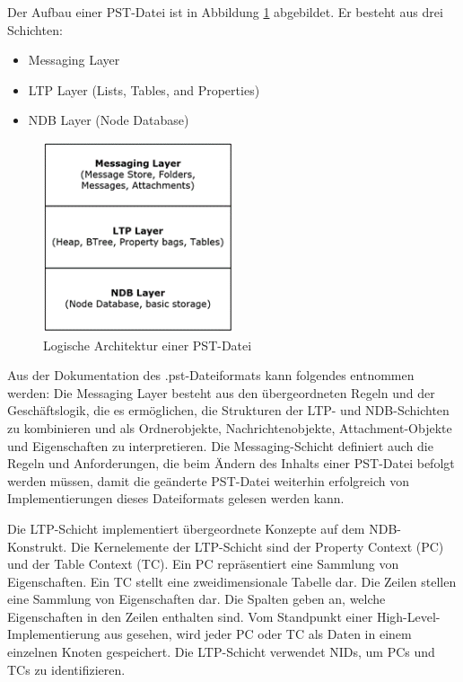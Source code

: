 \noindent Der Aufbau einer PST-Datei ist in Abbildung \ref{fig:pstarchitecture} abgebildet. Er besteht aus drei Schichten:

\begin{itemize}
    \item Messaging Layer
    \item LTP Layer (Lists, Tables, and Properties)
    \item NDB Layer (Node Database)
\end{itemize}

\begin{figure}[!ht]
    \centering
    \includegraphics[width=0.50\textwidth]{images/PST_File.png}
    \caption{Logische Architektur einer PST-Datei \cite{.c}} 
    \label{fig:pstarchitecture}
\end{figure}

\noindent Aus der Dokumentation \cite{.c} des .pst-Dateiformats kann folgendes entnommen werden: \newline
Die Messaging Layer besteht aus den übergeordneten Regeln und der Geschäftslogik, die es ermöglichen, die Strukturen der LTP- und NDB-Schichten zu kombinieren und als Ordnerobjekte, Nachrichtenobjekte, Attachment-Objekte und Eigenschaften zu interpretieren. Die Messaging-Schicht definiert auch die Regeln und Anforderungen, die beim Ändern des Inhalts einer PST-Datei befolgt werden müssen, damit die geänderte PST-Datei weiterhin erfolgreich von Implementierungen dieses Dateiformats gelesen werden kann. \smallskip


\noindent Die LTP-Schicht implementiert übergeordnete Konzepte auf dem NDB-Konstrukt. Die Kernelemente der LTP-Schicht sind der Property Context (PC) und der Table Context (TC). Ein PC repräsentiert eine Sammlung von Eigenschaften. Ein TC stellt eine zweidimensionale Tabelle dar. Die Zeilen stellen eine Sammlung von Eigenschaften dar. Die Spalten geben an, welche Eigenschaften in den Zeilen enthalten sind. Vom Standpunkt einer High-Level-Implementierung aus gesehen, wird jeder PC oder TC als Daten in einem einzelnen Knoten gespeichert. Die LTP-Schicht verwendet NIDs, um PCs und TCs zu identifizieren. \smallskip


